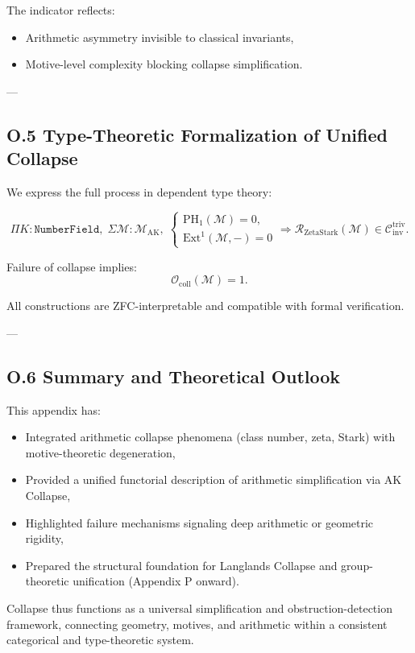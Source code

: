 \documentclass[11pt]{article}
\begin{document}
The indicator reflects:
\begin{itemize}
  \item Arithmetic asymmetry invisible to classical invariants,
  \item Motive-level complexity blocking collapse simplification.
\end{itemize}

---

\subsection*{O.5 Type-Theoretic Formalization of Unified Collapse}

We express the full process in dependent type theory:

\[
\Pi K : \texttt{NumberField}, \;
\Sigma \mathcal{M} : \mathcal{M}_{\mathrm{AK}}, \;
\begin{cases}
\mathrm{PH}_1(\mathcal{M}) = 0, \\
\mathrm{Ext}^1(\mathcal{M}, -) = 0
\end{cases}
\Rightarrow
\mathcal{R}_{\mathrm{ZetaStark}}(\mathcal{M}) \in \mathcal{C}_{\mathrm{inv}}^{\mathrm{triv}}.
\]

Failure of collapse implies:
\[
\mathcal{O}_{\mathrm{coll}}(\mathcal{M}) = 1.
\]

All constructions are ZFC-interpretable and compatible with formal verification.

---

\subsection*{O.6 Summary and Theoretical Outlook}

This appendix has:
\begin{itemize}
  \item Integrated arithmetic collapse phenomena (class number, zeta, Stark) with motive-theoretic degeneration,
  \item Provided a unified functorial description of arithmetic simplification via AK Collapse,
  \item Highlighted failure mechanisms signaling deep arithmetic or geometric rigidity,
  \item Prepared the structural foundation for Langlands Collapse and group-theoretic unification (Appendix P onward).
\end{itemize}

Collapse thus functions as a universal simplification and obstruction-detection framework, connecting geometry, motives, and arithmetic within a consistent categorical and type-theoretic system.
\end{document}
